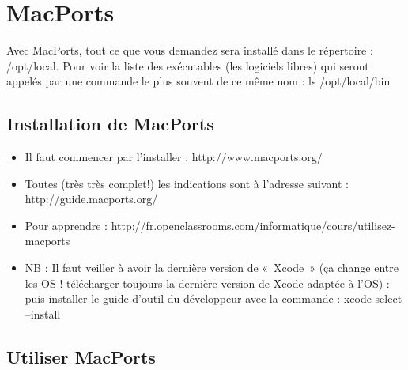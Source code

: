\section{MacPorts}\label{macports}

Avec MacPorts, tout ce que vous demandez sera installé dans le
répertoire : /opt/local. Pour voir la liste des exécutables (les
logiciels libres) qui seront appelés par une commande le plus souvent de
ce même nom : ls /opt/local/bin

\subsection{Installation de MacPorts}\label{installation-de-macports}

\begin{itemize}
\tightlist
\item
  Il faut commencer par l'installer : http://www.macports.org/
\item
  Toutes (très très complet!) les indications sont à l'adresse suivant :
  http://guide.macports.org/
\item
  Pour apprendre :
  http://fr.openclassrooms.com/informatique/cours/utilisez-macports
\item
  NB : Il faut veiller à avoir la dernière version de «~Xcode~» (ça
  change entre les OS ! télécharger toujours la dernière version de
  Xcode adaptée à l'OS) : puis installer le guide d'outil du développeur
  avec la commande : xcode-select --install
\end{itemize}

\subsection{Utiliser MacPorts}\label{utiliser-macports}

